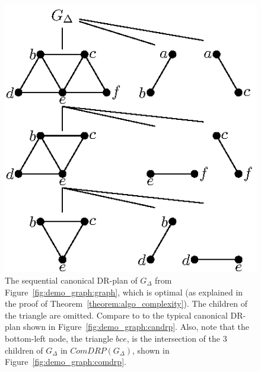

\begin{figure}\centering%
  \includegraphics[width=0.3\linewidth]{img/epsfromtikz/demo_graph_candrp_seq}
  \caption{The sequential canonical DR-plan of $G_{\Delta}$ from Figure~\ref{fig:demo_graph:graph}, which is optimal (as explained in the proof of Theorem~\ref{theorem:algo_complexity}). The children of the triangle are omitted. Compare to to the typical canonical DR-plan shown in Figure~\ref{fig:demo_graph:candrp}. Also, note that the bottom-left node, the triangle $bce$, is the intersection of the 3 children of $G_{\Delta}$ in $ComDRP(G_{\Delta})$, shown in Figure~\ref{fig:demo_graph:comdrp}.}
  \label{fig:demo_graph:candrpseq}
\end{figure}%

